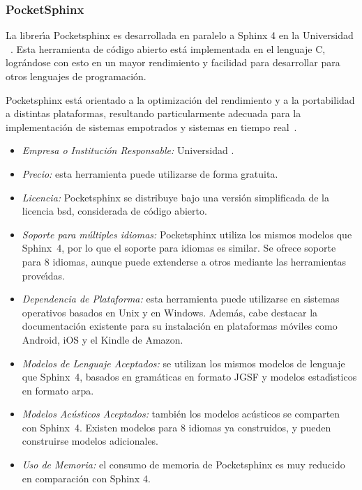 \subsubsection{PocketSphinx}
\label{sec:pocketsphinx}

La librer{\'\i}a Pocketsphinx es desarrollada en paralelo a Sphinx 4 en la Universidad
\mbox{ \cite{PocketSphinxHomePage}}. Esta herramienta de c\'odigo abierto
est\'a implementada en el lenguaje C, logr\'andose con esto en un mayor rendimiento y facilidad
para desarrollar  para otros lenguajes de programaci\'on.

Pocketsphinx est\'a orientado a la optimizaci\'on del rendimiento y a la portabilidad a distintas
plataformas, resultando particularmente adecuada para la implementaci\'on de sistemas empotrados
y sistemas en tiempo \mbox{real \cite{HugginsDainesPocketSphinx2006}}.

\begin{itemize}
	\item \emph{Empresa o Instituci\'on Responsable:} Universidad .
	\item \emph{Precio:} esta herramienta puede utilizarse de forma gratuita.
	\item \emph{Licencia:} Pocketsphinx se distribuye bajo una versi\'on simplificada de la licencia
	\gls{bsd}, considerada de c\'odigo abierto.
	\item \emph{Soporte para m\'ultiples idiomas:} Pocketsphinx utiliza los mismos modelos
	que \mbox{Sphinx 4}, por lo que el soporte para idiomas es similar. Se ofrece soporte para 8
	idiomas, aunque puede extenderse a otros mediante las herramientas prove{\'\i}das.
	\item \emph{Dependencia de Plataforma:} esta herramienta puede utilizarse en sistemas operativos
	basados en Unix y en Windows. Adem\'as, cabe destacar la documentaci\'on existente para su instalaci\'on
	en plataformas m\'oviles como Android, iOS y el Kindle de Amazon.
	\item \emph{Modelos de Lenguaje Aceptados:} se utilizan los mismos modelos de lenguaje que \mbox{Sphinx 4},
	basados en gram\'aticas en formato JGSF y modelos estad{\'\i}sticos en formato \gls{arpa}.
	\item \emph{Modelos Ac\'usticos Aceptados:} tambi\'en los modelos ac\'usticos se comparten con \mbox{Sphinx 4}.
	Existen modelos para 8 idiomas ya construidos, y pueden construirse modelos adicionales.
	\item \emph{Uso de Memoria:} el consumo de memoria de Pocketsphinx es muy reducido en comparaci\'on con
	Sphinx 4.
\end{itemize}